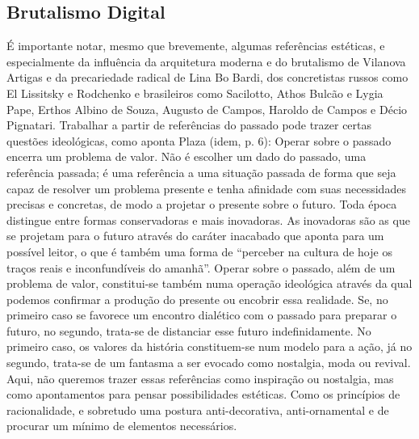 \subsection{Brutalismo Digital}
É importante notar, mesmo que brevemente, algumas referências  estéticas, e especialmente da influência da arquitetura moderna e do brutalismo de Vilanova Artigas e da precariedade radical de Lina Bo Bardi, dos concretistas russos como El Lissitsky e Rodchenko e brasileiros como Sacilotto, Athos Bulcão e Lygia Pape, Erthos Albino de Souza, Augusto de Campos, Haroldo de Campos e Décio Pignatari. Trabalhar a partir de  referências do passado pode trazer certas questões ideológicas, como aponta Plaza (idem, p. 6):
Operar sobre o passado encerra um problema de valor. Não é escolher um dado do passado, uma referência passada; é uma referência a uma situação passada de forma que seja capaz de resolver um problema presente e tenha afinidade com suas necessidades precisas e concretas, de modo a projetar o presente sobre o futuro. Toda época distingue entre formas conservadoras e mais inovadoras. As inovadoras são as que se projetam para o futuro através do caráter inacabado que aponta para um possível leitor, o que é também uma forma de ``perceber na cultura de hoje os traços reais e inconfundíveis do amanhã''. Operar sobre o passado, além de um problema de valor, constitui-se também numa operação ideológica através da qual podemos confirmar a produção do presente ou encobrir essa realidade. Se, no primeiro caso se favorece um encontro dialético com o passado para preparar o futuro, no segundo, trata-se de distanciar esse futuro indefinidamente. No primeiro caso, os valores da história constituem-se num modelo para a ação, já no segundo, trata-se de um fantasma a ser evocado como nostalgia, moda ou revival.
Aqui, não queremos trazer essas referências como inspiração ou nostalgia, mas como apontamentos para pensar possibilidades estéticas. Como os princípios de racionalidade,  e sobretudo uma postura anti-decorativa, anti-ornamental e de procurar um mínimo de elementos necessários. 

